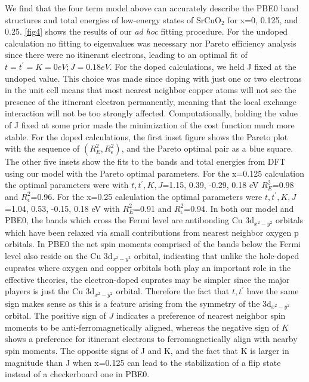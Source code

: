 \documentclass{article}
\begin{document}
We find that the four term model above can accurately describe the PBE0 band structures and total energies of low-energy states of SrCuO$_2$ for x=0, 0.125, and 0.25. \ref{fig4} shows the results of our \textit{ad hoc} fitting procedure. For the undoped calculation no fitting to eigenvalues was necessary nor Pareto efficiency analysis since there were no itinerant electrons, leading to an optimal fit of $t=t^\prime=K=0 eV; J = 0.18 eV$. For the doped calculations, we held J fixed at the undoped value. This choice was made since doping with just one or two electrons in the unit cell means that most nearest neighbor copper atoms will not see the presence of the itinerant electron permanently, meaning that the local exchange interaction will not be too strongly affected. Computationally, holding the value of J fixed at some prior made the minimization of the cost function much more stable. For the doped calculations, the first inset figure shows the Pareto plot with the sequence of $(R^2_E, R^2_\epsilon)$, and the Pareto optimal pair as a blue square. The other five insets show the fits to the bands and total energies from DFT using our model with the Pareto optimal parameters. For the x=0.125 calculation the optimal parameters were with $t,t^\prime,K,J$=1.15, 0.39, -0.29, 0.18 eV $R^2_E$=0.98 and $R^2_\epsilon$=0.96. For the x=0.25 calculation the optimal parameters were $t,t^\prime,K,J$=1.04, 0.53, -0.15, 0.18 eV with $R^2_E$=0.91 and $R^2_\epsilon$=0.94. In both our model and PBE0, the bands which cross the Fermi level are antibonding Cu 3d$_{x^2-y^2}$ orbitals which have been relaxed via small contributions from nearest neighbor oxygen p orbitals. In PBE0 the net spin moments comprised of the bands below the Fermi level also reside on the Cu 3d$_{x^2-y^2}$ orbital, indicating that unlike the hole-doped cuprates where oxygen and copper orbitals both play an important role in the effective theories, the electron-doped cuprates may be simpler since the major players is just the Cu 3d$_{x^2-y^2}$ orbital. Therefore the fact that $t, t^\prime$ have the same sign makes sense as this is a feature arising from the symmetry of the 3d$_{x^2-y^2}$ orbital. The positive sign of $J$ indicates a preference of nearest neighbor spin moments to be anti-ferromagnetically aligned, whereas the negative sign of $K$ shows a preference for itinerant electrons to ferromagnetically align with nearby spin moments. The opposite signs of J and K, and the fact that K is larger in magnitude than J when x=0.125 can lead to the stabilization of a flip state instead of a checkerboard one in PBE0. 
\end{document}
